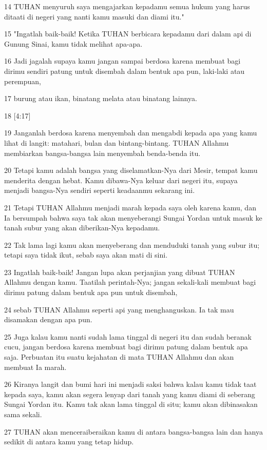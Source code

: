 \par 14 TUHAN menyuruh saya mengajarkan kepadamu semua hukum yang harus ditaati di negeri yang nanti kamu masuki dan diami itu."
\par 15 "Ingatlah baik-baik! Ketika TUHAN berbicara kepadamu dari dalam api di Gunung Sinai, kamu tidak melihat apa-apa.
\par 16 Jadi jagalah supaya kamu jangan sampai berdosa karena membuat bagi dirimu sendiri patung untuk disembah dalam bentuk apa pun, laki-laki atau perempuan,
\par 17 burung atau ikan, binatang melata atau binatang lainnya.
\par 18 [4:17]
\par 19 Janganlah berdosa karena menyembah dan mengabdi kepada apa yang kamu lihat di langit: matahari, bulan dan bintang-bintang. TUHAN Allahmu membiarkan bangsa-bangsa lain menyembah benda-benda itu.
\par 20 Tetapi kamu adalah bangsa yang diselamatkan-Nya dari Mesir, tempat kamu menderita dengan hebat. Kamu dibawa-Nya keluar dari negeri itu, supaya menjadi bangsa-Nya sendiri seperti keadaanmu sekarang ini.
\par 21 Tetapi TUHAN Allahmu menjadi marah kepada saya oleh karena kamu, dan Ia bersumpah bahwa saya tak akan menyeberangi Sungai Yordan untuk masuk ke tanah subur yang akan diberikan-Nya kepadamu.
\par 22 Tak lama lagi kamu akan menyeberang dan menduduki tanah yang subur itu; tetapi saya tidak ikut, sebab saya akan mati di sini.
\par 23 Ingatlah baik-baik! Jangan lupa akan perjanjian yang dibuat TUHAN Allahmu dengan kamu. Taatilah perintah-Nya; jangan sekali-kali membuat bagi dirimu patung dalam bentuk apa pun untuk disembah,
\par 24 sebab TUHAN Allahmu seperti api yang menghanguskan. Ia tak mau disamakan dengan apa pun.
\par 25 Juga kalau kamu nanti sudah lama tinggal di negeri itu dan sudah beranak cucu, jangan berdosa karena membuat bagi dirimu patung dalam bentuk apa saja. Perbuatan itu suatu kejahatan di mata TUHAN Allahmu dan akan membuat Ia marah.
\par 26 Kiranya langit dan bumi hari ini menjadi saksi bahwa kalau kamu tidak taat kepada saya, kamu akan segera lenyap dari tanah yang kamu diami di seberang Sungai Yordan itu. Kamu tak akan lama tinggal di situ; kamu akan dibinasakan sama sekali.
\par 27 TUHAN akan menceraiberaikan kamu di antara bangsa-bangsa lain dan hanya sedikit di antara kamu yang tetap hidup.
